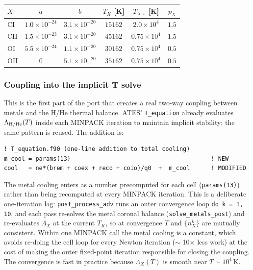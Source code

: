 \documentclass[english,a4paper]{my_memo}
\begin{document}
\begin{center}
\small
\begin{tabular}{|l|c|c|c|c|c|}
\hline
$X$  & $a$ & $b$ & $T_X$ [K] & $T_{X,s}$ [K] & $p_X$ \\
\hline
CI   & $1.0\times 10^{-24}$ & $3.1\times 10^{-20}$ & $15162$ & $2.0\times 10^4$ & $1.5$ \\
CII  & $1.5\times 10^{-23}$ & $3.1\times 10^{-20}$ & $45162$ & $0.75\times 10^4$ & $1.5$ \\
OI   & $5.5\times 10^{-24}$ & $1.1\times 10^{-20}$ & $30162$ & $0.75\times 10^4$ & $0.5$ \\
OII  & $0$                  & $5.1\times 10^{-20}$ & $35162$ & $0.75\times 10^4$ & $0.5$ \\
\hline
\end{tabular}
\end{center}

\subsubsection*{Coupling into the implicit T solve}

This is the first part of the port that creates a real two-way coupling
between metals and the H/He thermal balance. ATES' \texttt{T\_equation}
already evaluates $\Lambda_{\rm H/He}(T)$ inside each MINPACK iteration
to maintain implicit stability; the same pattern is reused. The
addition is:

\begin{verbatim}
! T_equation.f90 (one-line addition to total cooling)
m_cool = params(13)                                        ! NEW
cool   = ne*(brem + coex + reco + coio)/q0  +  m_cool      ! MODIFIED
\end{verbatim}

The metal cooling enters as a number precomputed for each cell
(\texttt{params(13)}) rather than being recomputed at every MINPACK
iteration. This is a deliberate one-iteration lag: \texttt{post\_process\_adv}
runs an outer convergence loop \texttt{do k = 1, 10}, and each pass
re-solves the metal coronal balance (\texttt{solve\_metals\_post}) and
re-evaluates $\Lambda_X$ at the current $T_K$, so at convergence
$T$ and $\{n_X^k\}$ are mutually consistent. Within one MINPACK call
the metal cooling is a constant, which avoids re-doing the cell loop
for every Newton iteration ($\sim$ 10$\times$ less work) at the cost of
making the outer fixed-point iteration responsible for closing the
coupling. The convergence is fast in practice because $\Lambda_X(T)$
is smooth near $T \sim 10^4\,$K.
\end{document}

